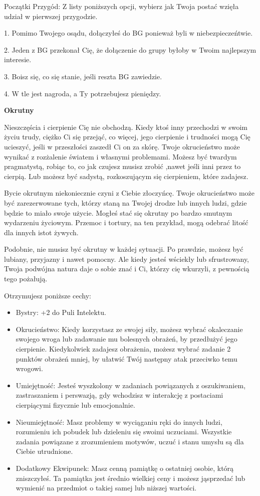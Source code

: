Początki Przygód: Z listy poniższych opcji, wybierz jak Twoja postać wzięła udział w pierwszej przygodzie.

1. Pomimo Twojego osądu, dołączyłeś do BG ponieważ byli w niebezpieczeńtwie.

2. Jeden z BG przekonał Cię, że dołączenie do grupy byłoby w Twoim najlepszym interesie.

3. Boisz się, co się stanie, jeśli reszta BG zawiedzie.

4. W tle jest nagroda, a Ty potrzebujesz pieniędzy.

\textbf{Okrutny}

Nieszczęścia i cierpienie Cię nie obchodzą. Kiedy ktoś inny przechodzi w swoim życiu trudy, ciężko Ci się przejąć, co więcej, jego cierpienie i trudności mogą Cię ucieszyć, jeśli w przeszłości zaszedł Ci on za skórę. Twoje okrucieństwo może wynikać z rozżalenie światem i własnymi problemami. Możesz być twardym pragmatystą, robiąc to, co jak czujesz musisz zrobić ,nawet jeśli inni przez to cierpią. Lub możesz być sadystą, rozkoszującym się cierpieniem, które zadajesz. 

Bycie okrutnym niekoniecznie czyni z Ciebie złoczyńcę. Twoje okrucieństwo może być zarezerwowane tych, którzy staną na Twojej drodze lub innych ludzi, gdzie będzie to miało swoje użycie. Mogłeś stać się okrutny po bardzo smutnym wydarzeniu życiowym. Przemoc i tortury, na ten przykład, mogą odebrać litość dla innych istot żywych.

Podobnie, nie musisz być okrutny w każdej sytuacji. Po prawdzie, możesz być lubiany, przyjazny i nawet pomocny. Ale kiedy jesteś wściekły lub sfrustrowany, Twoja podwójna natura daje o sobie znać i Ci, którzy cię wkurzyli, z pewnością tego pożałują.

Otrzymujesz poniższe cechy:
\begin{itemize}
    \item  Bystry: +2 do Puli Intelektu.
    \item  Okrucieństwo: Kiedy korzystasz ze swojej siły, możesz wybrać okaleczanie swojego wroga lub zadawanie mu bolesnych obrażeń, by przedłużyć jego cierpienie. Kiedykolwiek zadajesz obrażenia, możesz wybrać zadanie 2 punktów obrażeń mniej, by ułatwić Twój następny atak przeciwko temu wrogowi.
    \item  Umiejętność: Jesteś wyszkolony w zadaniach powiązanych z oszukiwaniem, zastraszaniem i perswazją, gdy wchodzisz w interakcję z postaciami cierpiącymi fizycznie lub emocjonalnie. 
    \item  Nieumiejętność: Masz problemy w wyciąganiu ręki do innych ludzi, rozumieniu ich pobudek lub dzieleniu się swoimi uczuciami. Wszystkie zadania powiązane z zrozumieniem motywów, uczuć i stanu umysłu są dla Ciebie utrudnione.
    \item  Dodatkowy Ekwipunek: Masz cenną pamiątkę o ostatniej osobie, którą zniszczyłeś. Ta pamiątka jest średnio wielkiej ceny i możesz jąsprzedać lub wymienić na przedmiot o takiej samej lub niższej wartości.
\end{itemize}

